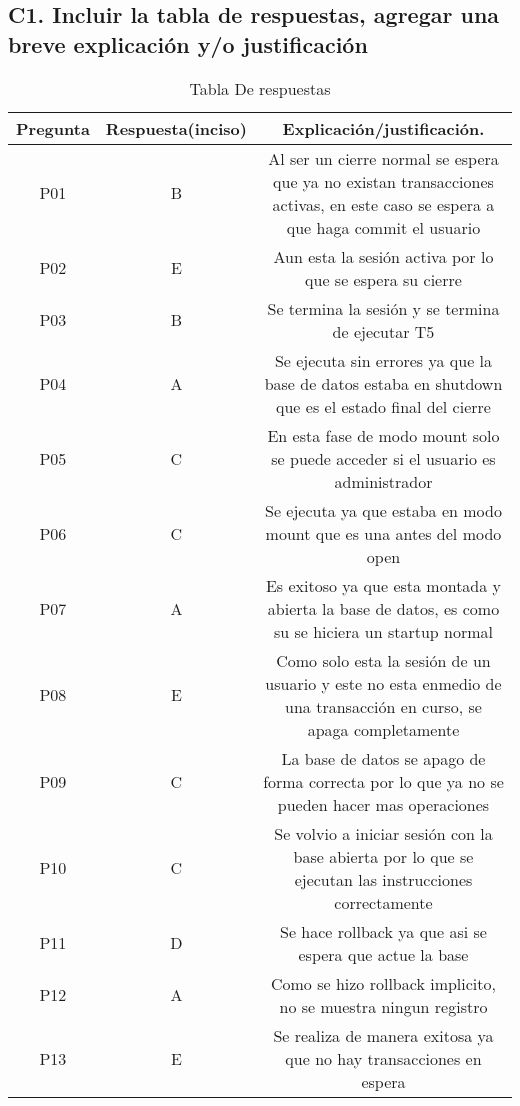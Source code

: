 \documentclass[journal]{IEEEtran}
\begin{document}
\subsection{C1.  Incluir la tabla de respuestas, agregar una breve explicación y/o justificación}
\begin{table}[H]
  \centering
  \begin{tabular}{||c |c| c||} 
   \hline
   Pregunta & Respuesta(inciso) &Explicación/justificación.\\ [1.0ex] 
   \hline
   P01 & B & Al ser un cierre normal se espera que ya no existan transacciones activas, en este caso se espera a que haga commit el usuario \\ \hline
   P02 & E & Aun esta la sesión activa por lo que se espera su cierre \\ \hline
   P03 & B & Se termina la sesión y se termina de ejecutar T5 \\ \hline
   P04 & A & Se ejecuta sin errores ya que la base de datos estaba en shutdown que es el estado final del cierre \\ \hline
   P05 & C & En esta fase de modo mount solo se puede acceder si el usuario es administrador \\ \hline
   P06 & C & Se ejecuta ya que estaba en modo mount que es una antes del modo open \\ \hline
   P07 & A & Es exitoso ya que esta montada y abierta la base de datos, es como su se hiciera un startup normal \\ \hline
   P08 & E & Como solo esta la sesión de un usuario y este no esta enmedio de una transacción en curso, se apaga completamente\\ \hline
   P09 & C & La base de datos se apago de forma correcta por lo que ya no se pueden hacer mas operaciones \\ \hline
   P10 & C & Se volvio a iniciar sesión con la base abierta por lo que se ejecutan las instrucciones correctamente \\ \hline
   P11 & D & Se hace rollback ya que asi se espera que actue la base \\ \hline
   P12 & A & Como se hizo rollback implicito, no se muestra ningun registro \\ \hline
   P13 & E & Se realiza de manera exitosa ya que no hay transacciones en espera \\  [1ex] 
   \hline
  \end{tabular}
  \caption{Tabla De respuestas}
  \label{tabla:1}
  \end{table}
\end{document}
